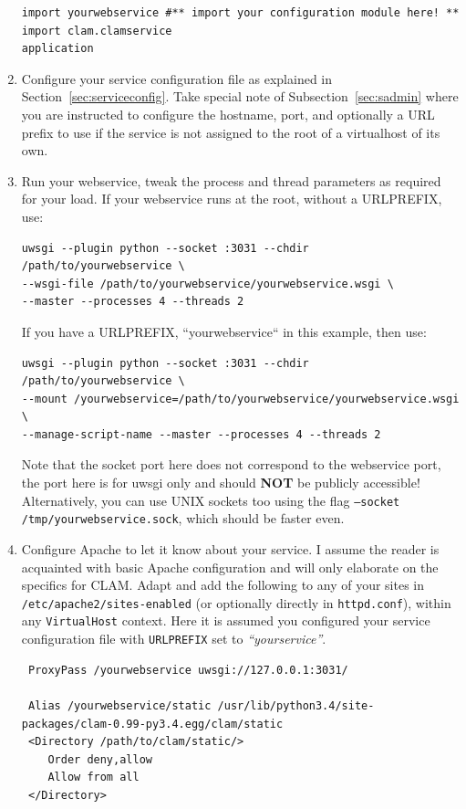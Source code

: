 \documentclass[a4paper,12pt,twoside,openright]{report}
\begin{document}
\begin{enumerate}[leftmargin=5mm]
{\begin{verbatim}
import yourwebservice #** import your configuration module here! **
import clam.clamservice
application\end{verbatim}
}
 
\item Configure your service configuration file as explained in
Section~\ref{sec:serviceconfig}. Take special note of
Subsection~\ref{sec:sadmin} where you are instructed to configure the
hostname, port, and optionally a URL prefix to use if the service is not
assigned to the root of a virtualhost of its own. 
\item Run your webservice, tweak the process and thread parameters as required
    for your load. If your webservice runs at the root, without a
    URLPREFIX, use:
{ \small
\begin{verbatim}
uwsgi --plugin python --socket :3031 --chdir /path/to/yourwebservice \ 
--wsgi-file /path/to/yourwebservice/yourwebservice.wsgi \
--master --processes 4 --threads 2
\end{verbatim}
}
If you have a URLPREFIX, ``yourwebservice`` in this example, then use:
{ \small
\begin{verbatim}
uwsgi --plugin python --socket :3031 --chdir /path/to/yourwebservice \
--mount /yourwebservice=/path/to/yourwebservice/yourwebservice.wsgi \
--manage-script-name --master --processes 4 --threads 2
\end{verbatim}
}

Note that the socket port here does not correspond to the webservice port, the
port here is for uwsgi only and should \textbf{NOT} be publicly accessible!
Alternatively, you can use UNIX sockets too using the flag \texttt{--socket
/tmp/yourwebservice.sock}, which should be faster even.
\item Configure Apache to let it know about your service. I assume the
reader is acquainted with basic Apache configuration and will only elaborate
on the specifics for CLAM. Adapt and add the following to any of your sites
in \texttt{/etc/apache2/sites-enabled} (or optionally directly in
\texttt{httpd.conf}), within any \texttt{VirtualHost} context. Here it is
assumed you configured your service configuration file with
\texttt{URLPREFIX} set to \emph{``yourservice''}.

{\small
\begin{verbatim}
 ProxyPass /yourwebservice uwsgi://127.0.0.1:3031/

 Alias /yourwebservice/static /usr/lib/python3.4/site-packages/clam-0.99-py3.4.egg/clam/static
 <Directory /path/to/clam/static/>
    Order deny,allow
    Allow from all
 </Directory>
\end{verbatim}
}


\end{enumerate}
\end{document}
